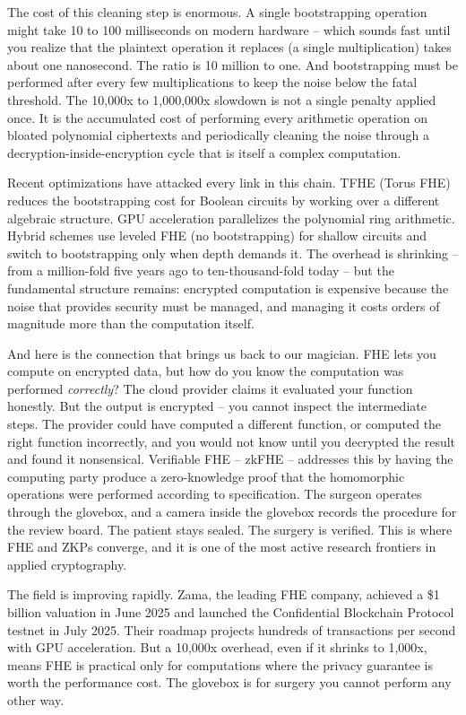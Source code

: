 \documentclass[
  11pt,
  openany]{report}
\begin{document}
The cost of this cleaning step is enormous. A single bootstrapping operation
might take 10 to 100 milliseconds on modern hardware -- which sounds fast until
you realize that the plaintext operation it replaces (a single multiplication)
takes about one nanosecond. The ratio is 10 million to one. And bootstrapping
must be performed after every few multiplications to keep the noise below the
fatal threshold. The 10,000x to 1,000,000x slowdown is not a single penalty
applied once. It is the accumulated cost of performing every arithmetic
operation on bloated polynomial ciphertexts and periodically cleaning the noise
through a decryption-inside-encryption cycle that is itself a complex
computation.

Recent optimizations have attacked every link in this chain. TFHE (Torus FHE)
reduces the bootstrapping cost for Boolean circuits by working over a different
algebraic structure. GPU acceleration parallelizes the polynomial ring
arithmetic. Hybrid schemes use leveled FHE (no bootstrapping) for shallow
circuits and switch to bootstrapping only when depth demands it. The overhead is
shrinking -- from a million-fold five years ago to ten-thousand-fold today --
but the fundamental structure remains: encrypted computation is expensive
because the noise that provides security must be managed, and managing it costs
orders of magnitude more than the computation itself.

And here is the connection that brings us back to our magician. FHE lets you
compute on encrypted data, but how do you know the computation was performed
\emph{correctly}? The cloud provider claims it evaluated your function honestly.
But the output is encrypted -- you cannot inspect the intermediate steps. The
provider could have computed a different function, or computed the right
function incorrectly, and you would not know until you decrypted the result and
found it nonsensical. Verifiable FHE -- zkFHE -- addresses this by having the
computing party produce a zero-knowledge proof that the homomorphic operations
were performed according to specification. The surgeon operates through the
glovebox, and a camera inside the glovebox records the procedure for the review
board. The patient stays sealed. The surgery is verified. This is where FHE and
ZKPs converge, and it is one of the most active research frontiers in applied
cryptography.

The field is improving rapidly. Zama, the leading FHE company, achieved a \$1
billion valuation in June 2025 and launched the Confidential Blockchain Protocol
testnet in July 2025. Their roadmap projects hundreds of transactions per second
with GPU acceleration. But a 10,000x overhead, even if it shrinks to 1,000x,
means FHE is practical only for computations where the privacy guarantee is
worth the performance cost. The glovebox is for surgery you cannot perform any
other way.
\end{document}
